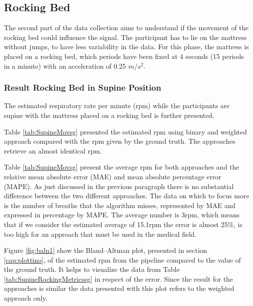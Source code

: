 \clearpage
\subsection{Rocking Bed}\label{cap:RockSavitx}
The second part of the data collection aims to understand if the movement of the
rocking bed could influence the signal. The participant has to lie on the mattress without jumps, to have less variability in the data. For this phase, the mattress is placed on a rocking bed, which periods have been fixed at 4 seconds (15 periods in a minute) with an acceleration of 0.25 $m/s^2$.



\subsubsection{Result Rocking Bed in Supine Position}  %

The estimated respiratory rate per minute (rpm) while the participants are supine with the mattress placed on a rocking bed is further presented. 

Table \ref{tab:SupineMovsg} presented the estimated rpm using binary and weighted approach compared with the rpm given by the ground truth. The approaches retrieve an almost identical rpm. 

\vspace{0.5cm}


Table \ref{tab:SupineMovsg} present the average rpm for both approaches  
and the relative mean absolute error (MAE) and mean absolute percentage error (MAPE). As just discussed in the previous paragraph there is no substantial difference between the two different approaches. The data on which to focus more is the number of breaths that the algorithm misses, represented by MAE and expressed in percentage by MAPE. The average number is 3rpm, which means that if we consider the estimated average of 15.1rpm the error is almost 25\%, is too high for an approach that must be used in the medical field.



Figure \ref{fig:baln1} show the Bland–Altman plot, presented in section \ref{cap:plottino}, of the estimated rpm from the pipeline compared to the value of the ground truth. It helps to visualize the data from Table \ref{tab:SupineRockingMetricssg} in respect of the error. Since the result for the approaches is similar the data presented with this plot refers to the weighted approach only.

